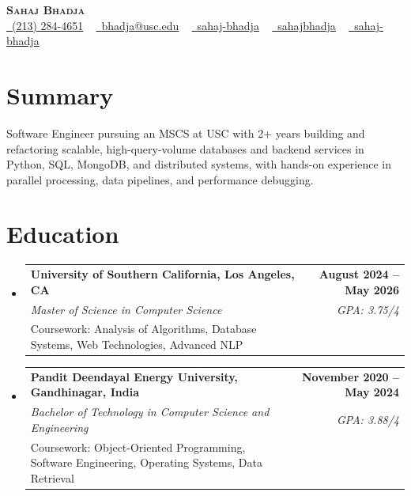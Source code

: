 \documentclass[letterpaper,10pt]{article}
\makeatletter
\newcommand{\resumeEduSubheading}[5]{\vspace{-1pt}\item\begin{tabular*}{1.0\textwidth}[t]{l@{\extracolsep{\fill}}r}\textbf{#1} & \textbf{\small #2} \\\textit{\small #3} & \textit{\small #4} \\\small #5 & \\\end{tabular*}\vspace{-4pt}}
\newcommand{\resumeSubHeadingListStart}{\begin{itemize}[leftmargin=0.0in, label={}]}
\newcommand{\resumeSubHeadingListEnd}{\end{itemize}}
\makeatother
\begin{document}
\begin{center}
{\Huge \scshape \textbf{Sahaj Bhadja}} \\ \vspace{1pt}
\small \href{tel:(213) 284-4651}{\faPhone\ \underline{(213) 284-4651}} ~ \href{mailto: bhadja@usc.edu}{\raisebox{-0.2\height}\faEnvelope\ \underline{bhadja@usc.edu}} ~
\href{https://www.linkedin.com/in/sahaj-bhadja/}{\raisebox{-0.2\height}\faLinkedin\ \underline{sahaj-bhadja}} ~ \href{https://github.com/SAHAJ-BHADJA}{\raisebox{-0.2\height}\faGithub\ \underline{sahajbhadja}} ~
\href{https://sahaj-bhadja.vercel.app/}{\raisebox{-0.2\height}\faGlobe\ \underline{sahaj-bhadja}}
\end{center}
\vspace{-16pt}
\section{Summary}
\begin{itemize}[leftmargin=0.15in, label={}]
\small{\item{Software Engineer pursuing an MSCS at USC with 2+ years building and refactoring scalable, high-query-volume databases and backend services in Python, SQL, MongoDB, and distributed systems, with hands-on experience in parallel processing, data pipelines, and performance debugging.}}
\end{itemize}
\vspace{-6pt}
\section{Education}
\resumeSubHeadingListStart
\resumeEduSubheading{University of Southern California, Los Angeles, CA}{August 2024 -- May 2026}{Master of Science in Computer Science}{GPA: 3.75/4}{Coursework: Analysis of Algorithms, Database Systems, Web Technologies, Advanced NLP}
\vspace{-9pt}
\resumeEduSubheading{Pandit Deendayal Energy University, Gandhinagar, India}{November 2020 -- May 2024}{Bachelor of Technology in Computer Science and Engineering}{GPA: 3.88/4}{Coursework: Object-Oriented Programming, Software Engineering, Operating Systems, Data Retrieval}
\resumeSubHeadingListEnd
\vspace{-6pt}
\end{document}
